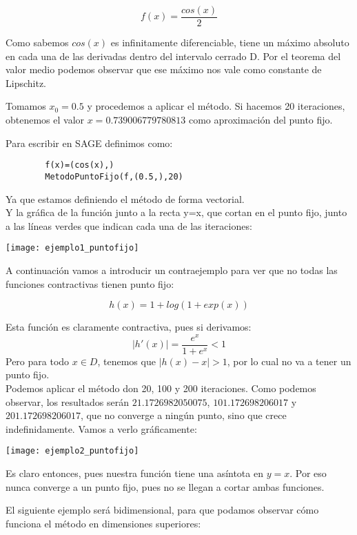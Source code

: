 \begin{example}
	$$f(x) = \frac{cos(x)}{2}$$
	
	Como sabemos $cos(x)$ es infinitamente diferenciable, tiene un máximo absoluto en cada una de las derivadas dentro del intervalo cerrado D. Por el teorema del valor medio podemos observar que ese máximo nos vale como constante de Lipschitz.
	
	Tomamos $x_0 = 0.5$ y procedemos a aplicar el método.
	Si hacemos 20 iteraciones, obtenemos el valor $x = 0.739006779780813$ como aproximación del punto fijo.
	
	Para escribir en SAGE definimos como:
	\begin{verbatim}
		f(x)=(cos(x),)
		MetodoPuntoFijo(f,(0.5,),20)
	\end{verbatim}
Ya que estamos definiendo el método de forma vectorial.\\

Y la gráfica de la función junto a la recta y=x, que cortan en el punto fijo, junto a las líneas verdes que indican cada una de las iteraciones:

\texttt{[image: ejemplo1\_puntofijo]}
\end{example}

A continuación vamos a introducir un contraejemplo para ver que no todas las funciones contractivas tienen punto fijo:

\begin{example}
$$h(x) = 1+log(1+ exp(x)) $$

Esta función es claramente contractiva, pues si derivamos:
$$|h'(x)| = \frac{e^{x}}{1+e^{x}} < 1$$
Pero para todo $x \in D$, tenemos que $|h(x)-x| > 1$, por lo cual no va a tener un punto fijo.\\

Podemos aplicar el método don 20, 100 y 200 iteraciones. Como podemos observar, los resultados serán $21.1726982050075$, $101.172698206017$ y $201.172698206017$, que no converge a ningún punto, sino que crece indefinidamente. Vamos a verlo gráficamente:


\texttt{[image: ejemplo2\_puntofijo]}

Es claro entonces, pues nuestra función tiene una asíntota en $y=x$. Por eso nunca converge a un punto fijo, pues no se llegan a cortar ambas funciones.


\end{example}

El siguiente ejemplo será bidimensional, para que podamos observar cómo funciona el método en dimensiones superiores:

